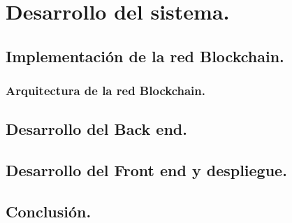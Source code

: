 \section{Desarrollo del sistema.}

\subsection{Implementación de la red Blockchain.}

\subsubsection{Arquitectura de la red Blockchain.}

\subsection{Desarrollo del Back end.}

\subsection{Desarrollo del Front end y despliegue.}

\subsection{Conclusión.}

\newpage